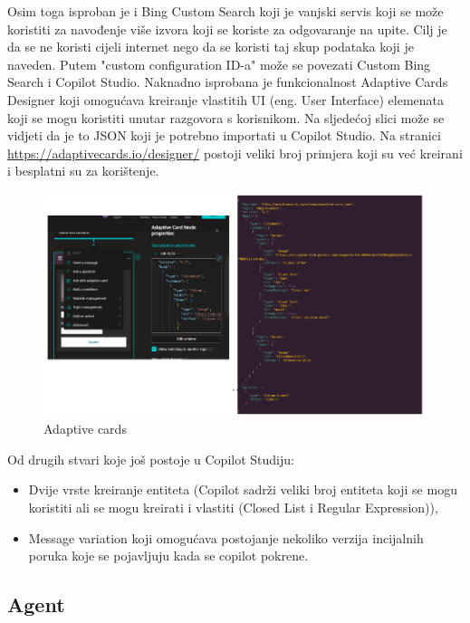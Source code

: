 \documentclass[]{foi}
\begin{document}
Osim toga isproban je i Bing Custom Search koji je vanjski servis koji se može koristiti za navođenje više izvora koji se koriste za odgovaranje na upite. Cilj je da se ne koristi cijeli
internet nego da se koristi taj skup podataka koji je naveden. Putem "custom configuration ID-a" može se povezati Custom Bing Search i Copilot Studio.
Naknadno isprobana je funkcionalnost Adaptive Cards Designer koji omogućava kreiranje vlastitih UI (eng. User Interface) elemenata koji se mogu koristiti unutar razgovora s korisnikom. 
Na sljedećoj slici može se vidjeti da je to JSON koji je potrebno importati u Copilot Studio. Na stranici \underline{https://adaptivecards.io/designer/} postoji veliki broj 
primjera koji su već kreirani i besplatni su za korištenje.

\begin{figure}[ht!]
    \centering
    \includegraphics[width=1\textwidth]{./assets/Adaptive_cards.png} 
    \caption{Adaptive cards}
    \label{fig:slika3}
\end{figure}

Od drugih stvari koje još postoje u Copilot Studiju:
\begin{itemize}
\item Dvije vrste kreiranje entiteta (Copilot sadrži veliki broj entiteta koji se mogu koristiti ali se mogu kreirati i vlastiti (Closed List i Regular Expression)),
\item Message variation koji omogućava postojanje nekoliko verzija incijalnih poruka koje se pojavljuju kada se copilot pokrene. 
\end{itemize}

\subsection{Agent}
\end{document}
